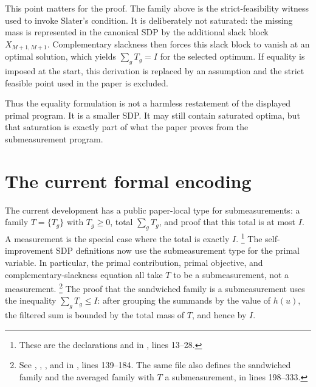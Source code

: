 \documentclass[11pt]{article}
\begin{document}
This point matters for the proof. The family above is the strict-feasibility
witness used to invoke Slater's condition. It is deliberately not saturated:
the missing mass is represented in the canonical SDP by the additional slack
block $X_{M+1,M+1}$. Complementary slackness then forces this slack block to
vanish at an optimal solution, which yields $\sum_g T_g=I$ for the selected
optimum. If equality is imposed at the start, this derivation is replaced by an
assumption and the strict feasible point used in the paper is excluded.

Thus the equality formulation is not a harmless restatement of the displayed
primal program. It is a smaller SDP. It may still contain saturated optima, but
that saturation is exactly part of what the paper proves from the submeasurement
program.

\section{The current formal encoding}

The current development has a public paper-local type for submeasurements: a
family $T=\{T_g\}$ with $T_g\ge 0$, total
$\sum_g T_g$, and proof that this total is at most $I$. A measurement is the
special case where the total is exactly $I$.
\footnote{These are the declarations
 and  in
, lines 13--28.}
The self-improvement SDP definitions now use the submeasurement type for the
primal variable. In particular, the primal contribution, primal objective, and
complementary-slackness equation all take $T$ to be a submeasurement, not a
measurement.
\footnote{See
,
,
, and
 in
, lines 139--184. The same file
also defines the sandwiched family  and the
averaged family  with
$T$ a submeasurement, in lines 198--333.}
The proof that the sandwiched family is a submeasurement uses the inequality
$\sum_g T_g\le I$: after grouping the summands by the value of $h(u)$, the
filtered sum is bounded by the total mass of $T$, and hence by $I$.
\end{document}
